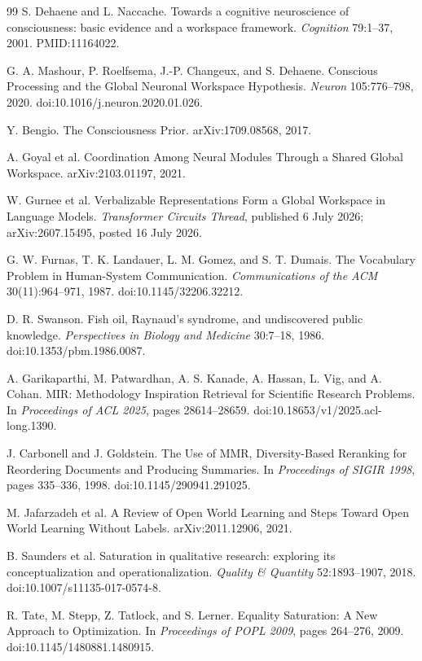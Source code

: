 \documentclass[11pt]{article}
\begin{document}
\begin{thebibliography}{99}
 S. Dehaene and L. Naccache. Towards a cognitive neuroscience of consciousness: basic evidence and a workspace framework. \emph{Cognition} 79:1--37, 2001. PMID:11164022.

 G. A. Mashour, P. Roelfsema, J.-P. Changeux, and S. Dehaene. Conscious Processing and the Global Neuronal Workspace Hypothesis. \emph{Neuron} 105:776--798, 2020. doi:10.1016/j.neuron.2020.01.026.

 Y. Bengio. The Consciousness Prior. arXiv:1709.08568, 2017.

 A. Goyal et al. Coordination Among Neural Modules Through a Shared Global Workspace. arXiv:2103.01197, 2021.

 W. Gurnee et al. Verbalizable Representations Form a Global Workspace in Language Models. \emph{Transformer Circuits Thread}, published 6 July 2026; arXiv:2607.15495, posted 16 July 2026.

 G. W. Furnas, T. K. Landauer, L. M. Gomez, and S. T. Dumais. The Vocabulary Problem in Human-System Communication. \emph{Communications of the ACM} 30(11):964--971, 1987. doi:10.1145/32206.32212.

 D. R. Swanson. Fish oil, Raynaud's syndrome, and undiscovered public knowledge. \emph{Perspectives in Biology and Medicine} 30:7--18, 1986. doi:10.1353/pbm.1986.0087.

 A. Garikaparthi, M. Patwardhan, A. S. Kanade, A. Hassan, L. Vig, and A. Cohan. MIR: Methodology Inspiration Retrieval for Scientific Research Problems. In \emph{Proceedings of ACL 2025}, pages 28614--28659. doi:10.18653/v1/2025.acl-long.1390.

 J. Carbonell and J. Goldstein. The Use of MMR, Diversity-Based Reranking for Reordering Documents and Producing Summaries. In \emph{Proceedings of SIGIR 1998}, pages 335--336, 1998. doi:10.1145/290941.291025.

 M. Jafarzadeh et al. A Review of Open World Learning and Steps Toward Open World Learning Without Labels. arXiv:2011.12906, 2021.

 B. Saunders et al. Saturation in qualitative research: exploring its conceptualization and operationalization. \emph{Quality \& Quantity} 52:1893--1907, 2018. doi:10.1007/s11135-017-0574-8.

 R. Tate, M. Stepp, Z. Tatlock, and S. Lerner. Equality Saturation: A New Approach to Optimization. In \emph{Proceedings of POPL 2009}, pages 264--276, 2009. doi:10.1145/1480881.1480915.


\end{thebibliography}
\end{document}
